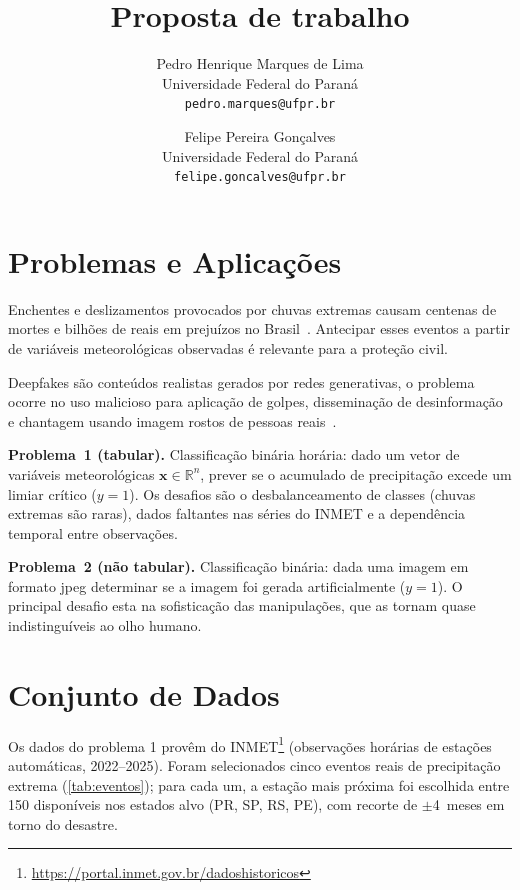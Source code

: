 \documentclass[10pt,twocolumn,letterpaper]{article}
\begin{document}
\title{Proposta de trabalho}

\author{
Pedro Henrique Marques de Lima \\
Universidade Federal do Paraná \\
{\tt\small pedro.marques@ufpr.br}
\and
Felipe Pereira Gonçalves \\
Universidade Federal do Paraná \\
{\tt\small felipe.goncalves@ufpr.br}
}
\maketitle

\section{Problemas e Aplicações}

Enchentes e deslizamentos provocados por chuvas extremas causam
centenas de mortes e bilhões de reais em prejuízos no
Brasil~\cite{marengo2020trends,cenad2024}. Antecipar esses eventos a
partir de variáveis meteorológicas observadas é relevante para a
proteção civil.

Deepfakes são conteúdos realistas gerados por redes generativas, o problema ocorre no uso malicioso para aplicação de golpes, disseminação de desinformação e chantagem usando imagem rostos de pessoas reais~\cite{Rafique2023,Mary2023}.

\textbf{Problema~1 (tabular).}
Classificação binária horária: dado um vetor de variáveis
meteorológicas $\mathbf{x}\!\in\!\mathbb{R}^{n}$, prever se o
acumulado de precipitação excede um limiar crítico ($y\!=\!1$).
Os desafios são o desbalanceamento de classes (chuvas extremas são
raras), dados faltantes nas séries do INMET e a dependência temporal
entre observações.


\textbf{Problema~2 (não tabular).} Classificação binária: dada uma imagem em formato jpeg determinar se a imagem foi gerada artificialmente ($y\!=\!1$).
 O principal desafio esta na sofisticação das manipulações, que as tornam quase indistinguíveis ao olho humano.

\section{Conjunto de Dados}

Os dados do problema 1 provêm do INMET\footnote{\url{https://portal.inmet.gov.br/dadoshistoricos}}
(observações horárias de estações automáticas, 2022--2025). Foram
selecionados cinco eventos reais de precipitação extrema
(\cref{tab:eventos}); para cada um, a estação mais próxima foi
escolhida entre 150 disponíveis nos estados alvo (PR, SP, RS, PE),
com recorte de $\pm$4~meses em torno do desastre. 
\end{document}
